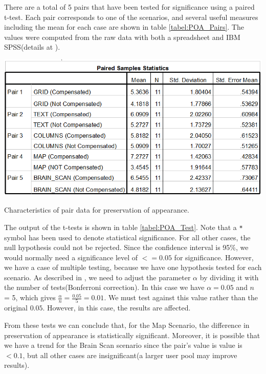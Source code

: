 \documentclass[]{article}
\begin{document}
There are a total of 5 pairs that have been tested for significance using a paired t-test. Each pair corresponds to one of the scenarios, and several useful measures including the mean for each case are shown in table \ref{tabel:POA_Pairs}. The values were computed from the raw data with both a spreadsheet and IBM SPSS(details at \cite{spss}).

\begin{table}[!h]
  \includegraphics[width=\linewidth]{figures/results/POA_Pairs.PNG}
  \caption{Characteristics of pair data for preservation of appearance.}
  \label{tabel:POA_Pairs}
\end{table}

The output of the t-tests is shown in table \ref{tabel:POA_Test}. Note that a \verb|*| symbol has been used to denote statistical significance. For all other cases, the null hypothesis could not be rejected. Since the confidence interval is 95\%, we would normally need a significance level of $<= 0.05$ for significance. However, we have a case of multiple testing, because we have one hypothesis tested for each scenario. As described in \cite{bonferroni}, we need to adjust the parameter $\alpha$ by dividing it with the number of tests(Bonferroni correction). In this case we have $\alpha = 0.05$ and $n$ = 5, which gives $\frac{\alpha}{n} = \frac{0.05}{5} = 0.01$. We must test against this value rather than the original $0.05$. However, in this case, the results are affected.

From these tests we can conclude that, for the Map Scenario, the difference in preservation of appearance is statistically significant. Moreover, it is possible that we have a trend for the Brain Scan scenario since the pair's value is  value is $< 0.1$, but all other cases are insignificant(a larger user pool may improve results).
\end{document}
